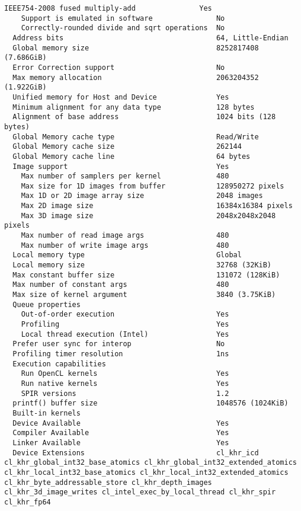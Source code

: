 \documentclass{article}
\begin{document}
\begin{lstlisting}[language={}]
    IEEE754-2008 fused multiply-add               Yes
    Support is emulated in software               No
    Correctly-rounded divide and sqrt operations  No
  Address bits                                    64, Little-Endian
  Global memory size                              8252817408 (7.686GiB)
  Error Correction support                        No
  Max memory allocation                           2063204352 (1.922GiB)
  Unified memory for Host and Device              Yes
  Minimum alignment for any data type             128 bytes
  Alignment of base address                       1024 bits (128 bytes)
  Global Memory cache type                        Read/Write
  Global Memory cache size                        262144
  Global Memory cache line                        64 bytes
  Image support                                   Yes
    Max number of samplers per kernel             480
    Max size for 1D images from buffer            128950272 pixels
    Max 1D or 2D image array size                 2048 images
    Max 2D image size                             16384x16384 pixels
    Max 3D image size                             2048x2048x2048 pixels
    Max number of read image args                 480
    Max number of write image args                480
  Local memory type                               Global
  Local memory size                               32768 (32KiB)
  Max constant buffer size                        131072 (128KiB)
  Max number of constant args                     480
  Max size of kernel argument                     3840 (3.75KiB)
  Queue properties                                
    Out-of-order execution                        Yes
    Profiling                                     Yes
    Local thread execution (Intel)                Yes
  Prefer user sync for interop                    No
  Profiling timer resolution                      1ns
  Execution capabilities                          
    Run OpenCL kernels                            Yes
    Run native kernels                            Yes
    SPIR versions                                 1.2
  printf() buffer size                            1048576 (1024KiB)
  Built-in kernels                                
  Device Available                                Yes
  Compiler Available                              Yes
  Linker Available                                Yes
  Device Extensions                               cl_khr_icd cl_khr_global_int32_base_atomics cl_khr_global_int32_extended_atomics cl_khr_local_int32_base_atomics cl_khr_local_int32_extended_atomics cl_khr_byte_addressable_store cl_khr_depth_images cl_khr_3d_image_writes cl_intel_exec_by_local_thread cl_khr_spir cl_khr_fp64 


\end{lstlisting}
\end{document}
